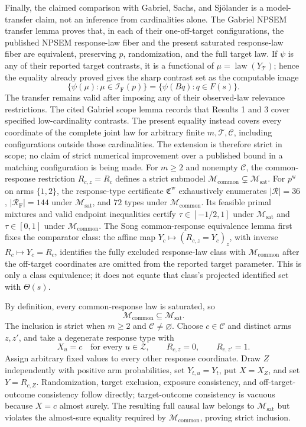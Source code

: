 Finally, the claimed comparison with Gabriel, Sachs, and Sj\"olander is a model-transfer claim, not an inference from cardinalities alone.  The Gabriel NPSEM transfer lemma proves that, in each of their one-off-target configurations, the published NPSEM response-law fiber and the present saturated response-law fiber are equivalent, preserving \(p\), randomization, and the full target law.  If \(\psi\) is any of their reported target contrasts, it is a functional of \(\mu=\operatorname{law}(Y_{\mathcal T})\); hence the equality already proved gives the sharp contrast set as the computable image
\[
\{\psi(\mu):\mu\in\mathcal I_{\mathrm F}(p)\}
=\{\psi(Bq):q\in F(s)\}.
\]
The transfer remains valid after imposing any of their observed-law relevance restrictions.  The cited Gabriel scope lemma records that Results 1 and 3 cover specified low-cardinality contrasts.  The present equality instead covers every coordinate of the complete joint law for arbitrary finite \(m,\mathcal T,\mathcal C\), including configurations outside those cardinalities.  The extension is therefore strict in scope; no claim of strict numerical improvement over a published bound in a matching configuration is being made.
For \(m\ge2\) and nonempty \(\mathcal C\), the common-response restriction \(R_{c,z}=R_c\) defines a strict submodel \(\mathcal M_{\mathrm{common}}\subsetneq\mathcal M_{\mathrm{sat}}\). For \(p^{\mathrm w}\) on arms \(\{1,2\}\), the response-type certificate \(\mathfrak C^{\mathrm w}\) exhaustively enumerates \(|\mathcal R|=36\), \(|\mathcal R_{\mathrm F}|=144\) under \(\mathcal M_{\mathrm{sat}}\), and \(72\) types under \(\mathcal M_{\mathrm{common}}\). Its feasible primal mixtures and valid endpoint inequalities certify \(\tau\in[-1/2,1]\) under \(\mathcal M_{\mathrm{sat}}\) and \(\tau\in[0,1]\) under \(\mathcal M_{\mathrm{common}}\).
The Song common-response equivalence lemma first fixes the comparator class: the affine map \(Y_c\mapsto(R_{c,z}=Y_c)_z\), with inverse \(R_c\mapsto Y_c=R_c\), identifies the fully excluded response-law class with \(\mathcal M_{\mathrm{common}}\) after the off-target coordinates are omitted from the reported target parameter.  This is only a class equivalence; it does not equate that class's projected identified set with \(\Theta(s)\).

By definition, every common-response law is saturated, so
\[
\mathcal M_{\mathrm{common}}\subseteq\mathcal M_{\mathrm{sat}}.
\]
The inclusion is strict when \(m\ge2\) and \(\mathcal C\ne\varnothing\).  Choose \(c\in\mathcal C\) and distinct arms \(z,z'\), and take a degenerate response type with
\[
X_u=c\quad\text{for every }u\in\mathcal Z,
\qquad R_{c,z}=0,
\qquad R_{c,z'}=1.
\]
Assign arbitrary fixed values to every other response coordinate.  Draw \(Z\) independently with positive arm probabilities, set \(Y_{t,u}=Y_t\), put \(X=X_Z\), and set \(Y=R_{c,Z}\).  Randomization, target exclusion, exposure consistency, and off-target-outcome consistency follow directly; target-outcome consistency is vacuous because \(X=c\) almost surely.  The resulting full causal law belongs to \(\mathcal M_{\mathrm{sat}}\) but violates the almost-sure equality required by \(\mathcal M_{\mathrm{common}}\), proving strict inclusion.

